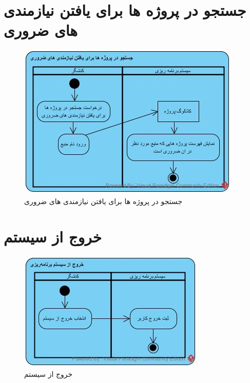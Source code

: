 \section{جستجو در پروژه ها برای یافتن نیازمندی های ضروری}
\begin{figure}[H]
	\centering
	\includegraphics[scale=1]{img/activity/SearchForEssentialRequirements}
	\caption{جستجو در پروژه ها برای یافتن نیازمندی های ضروری}
\end{figure}


\section{خروج از سیستم}
\begin{figure}[H]
	\centering
	\includegraphics[scale=1]{img/activity/SignOut}
	\caption{خروج از سیستم}
\end{figure}


